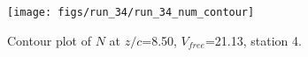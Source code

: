 \begin{figure}[H]
\centering
\texttt{[image: figs/run\_34/run\_34\_num\_contour]}
\caption{Contour plot of $N$ at $z/c$=8.50, $V_{free}$=21.13, station 4.}
\label{fig:run_34_num_contour}
\end{figure}


